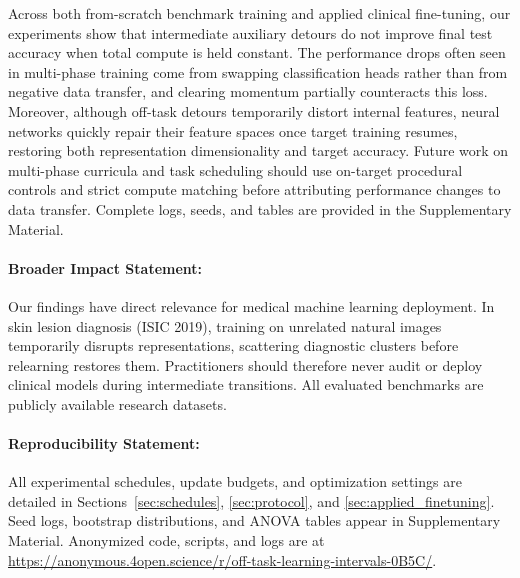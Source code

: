 \documentclass[10pt]{article}
\begin{document}
Across both from-scratch benchmark training and applied clinical fine-tuning, our experiments show that intermediate auxiliary detours do not improve final test accuracy when total compute is held constant. The performance drops often seen in multi-phase training come from swapping classification heads rather than from negative data transfer, and clearing momentum partially counteracts this loss. Moreover, although off-task detours temporarily distort internal features, neural networks quickly repair their feature spaces once target training resumes, restoring both representation dimensionality and target accuracy. Future work on multi-phase curricula and task scheduling should use on-target procedural controls and strict compute matching before attributing performance changes to data transfer. Complete logs, seeds, and tables are provided in the Supplementary Material.

\paragraph{Broader Impact Statement:}
Our findings have direct relevance for medical machine learning deployment. In skin lesion diagnosis (ISIC 2019), training on unrelated natural images temporarily disrupts representations, scattering diagnostic clusters before relearning restores them. Practitioners should therefore never audit or deploy clinical models during intermediate transitions. All evaluated benchmarks are publicly available research datasets.

\paragraph{Reproducibility Statement:}
All experimental schedules, update budgets, and optimization settings are detailed in Sections~\ref{sec:schedules}, \ref{sec:protocol}, and \ref{sec:applied_finetuning}. Seed logs, bootstrap distributions, and ANOVA tables appear in Supplementary Material. Anonymized code, scripts, and logs are at \url{https://anonymous.4open.science/r/off-task-learning-intervals-0B5C/}.

{\footnotesize
\setlength{\bibsep}{-0.5pt}


}
\end{document}
